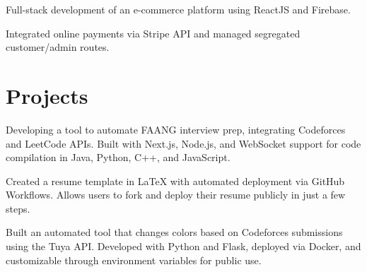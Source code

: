 \documentclass[]{dhirendra-pratap-singh-resume}
\begin{document}
\begin{minipage}[t]{0.66\textwidth}
\begin{tightemize}
\item Full-stack development of an e-commerce platform using ReactJS and Firebase.
\item Integrated online payments via Stripe API and managed segregated customer/admin routes.
\end{tightemize}


\section{Projects}
\href{https://faangcracker.hanisntsolo.com/}{}
\begin{tightemize}
\item Developing a tool to automate FAANG interview prep, integrating Codeforces and LeetCode APIs. Built with Next.js, Node.js, and WebSocket support for code compilation in Java, Python, C++, and JavaScript.
\end{tightemize}

\href{https://github.com/hanisntsolo/resume}{}
\begin{tightemize}
\item Created a resume template in LaTeX with automated deployment via GitHub Workflows. Allows users to fork and deploy their resume publicly in just a few steps.
\end{tightemize}

\href{https://github.com/hanisntsolo/codeforces-lamp}{}
\begin{tightemize}
\item Built an automated tool that changes colors based on Codeforces submissions using the Tuya API. Developed with Python and Flask, deployed via Docker, and customizable through environment variables for public use.
\end{tightemize}


\end{minipage}
\end{document}
